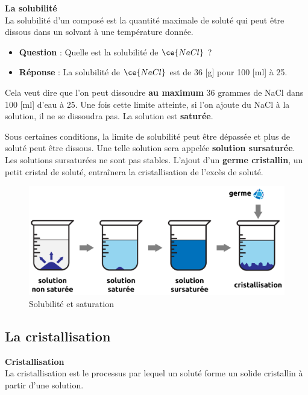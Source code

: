 \documentclass[
  11pt,
  a4paper,
  openany]{book}
\providecommand{\tightlist}{%
  \setlength{\itemsep}{0pt}\setlength{\parskip}{0pt}}
\begin{document}
\begin{tcolorbox}
\textbf{La solubilité}\\
La solubilité d'un composé est la quantité maximale de soluté qui peut être dissous dans un solvant à une température donnée.

\end{tcolorbox}

\begin{itemize}
\tightlist
\item
  \textbf{Question} : Quelle est la solubilité de \(\ce{NaCl}\) ?
\item
  \textbf{Réponse} : La solubilité de \(\ce{NaCl}\) est de 36 {[}g{]} pour 100 {[}ml{]} à 25\celsius.
\end{itemize}

Cela veut dire que l'on peut dissoudre \textbf{au maximum} 36 grammes de NaCl dans 100 {[}ml{]} d'eau à 25\celsius. Une fois cette limite atteinte, si l'on ajoute du NaCl à la solution, il ne se dissoudra pas. La solution est \textbf{saturée}.

Sous certaines conditions, la limite de solubilité peut être dépassée et plus de soluté peut être dissous. Une telle solution sera appelée \textbf{solution sursaturée}. Les solutions sursaturées ne sont pas stables. L'ajout d'un \textbf{germe cristallin}, un petit cristal de soluté, entraînera la cristallisation de l'excès de soluté.

\begin{figure}

{\centering \includegraphics[width=0.67\linewidth]{images/solution} 

}

\caption{Solubilité et saturation}\label{fig:solubilite-saturation}
\end{figure}

\hypertarget{la-cristallisation}{%
\subsection{La cristallisation}\label{la-cristallisation}}

\begin{tcolorbox}
\textbf{Cristallisation}\\
La cristallisation est le processus par lequel un soluté forme un solide cristallin à partir d'une solution.

\end{tcolorbox}
\end{document}
